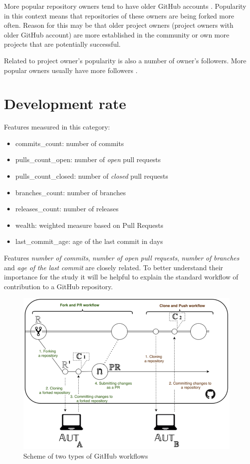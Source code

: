 More popular repository owners tend to have older GitHub accounts \cite{p:10}.
Popularity in this context means that repositories of these owners are being forked more often.
Reason for this may be that older project owners (project owners with older GitHub account) are more established in the community or own more projects that are potentially successful.

Related to project owner's popularity is also a number of owner's followers.
More popular owners usually have more followers \cite{p:14}.

\section{Development rate}
\label{sec:development_rate}

Features measured in this category:

\begin{itemize}
    \item commits\_count: number of commits
    \item pulls\_count\_open: number of \emph{open} pull requests
    \item pulls\_count\_closed: number of \emph{closed} pull requests
    \item branches\_count: number of branches
    \item releases\_count: number of releases
    \item wealth: weighted measure based on Pull Requests
    \item last\_commit\_age: age of the last commit in days
\end{itemize}

Features \emph{number of commits}, \emph{number of open pull requests}, \emph{number of branches} and \emph{age of the last commit} are closely related.
To better understand their importance for the study it will be helpful to explain the standard workflow of contribution to a GitHub repository.

\begin{figure}
    \centering
    \includegraphics[scale=0.5]{chapters/chapter2/git_workflow.png}
    \caption{Scheme of two types of GitHub workflows \cite{git_workflow}}
    \label{fig:git_workflow}
\end{figure}

